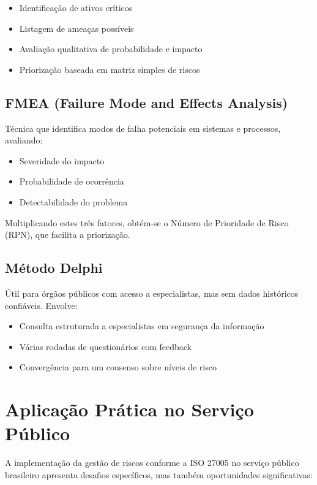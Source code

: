 \documentclass[12pt,a4paper]{report}
\begin{document}
\begin{itemize}
  \item Identificação de ativos críticos
  \item Listagem de ameaças possíveis
  \item Avaliação qualitativa de probabilidade e impacto
  \item Priorização baseada em matriz simples de riscos
\end{itemize}

\subsection{FMEA (Failure Mode and Effects Analysis)}

Técnica que identifica modos de falha potenciais em sistemas e processos, avaliando:

\begin{itemize}
  \item Severidade do impacto
  \item Probabilidade de ocorrência
  \item Detectabilidade do problema
\end{itemize}

Multiplicando estes três fatores, obtém-se o Número de Prioridade de Risco (RPN), que facilita a priorização.

\subsection{Método Delphi}

Útil para órgãos públicos com acesso a especialistas, mas sem dados históricos confiáveis. Envolve:

\begin{itemize}
  \item Consulta estruturada a especialistas em segurança da informação
  \item Várias rodadas de questionários com feedback
  \item Convergência para um consenso sobre níveis de risco
\end{itemize}

\section{Aplicação Prática no Serviço Público}

A implementação da gestão de riscos conforme a ISO 27005 no serviço público brasileiro apresenta desafios específicos, mas também oportunidades significativas:
\end{document}

